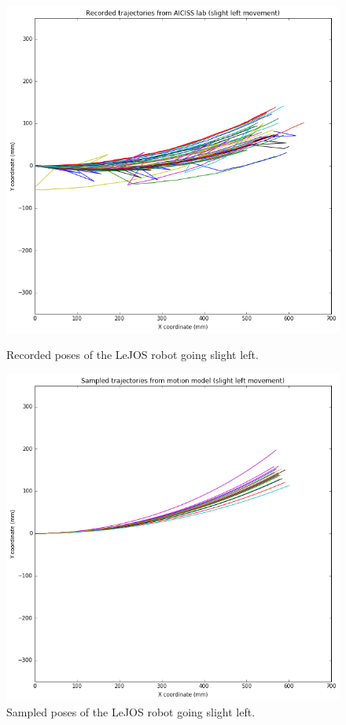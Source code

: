 \documentclass[paper=a4, fontsize=11pt]{scrartcl} %
\begin{document}
	\begin{figure}[h!]
		\centering
		\begin{minipage}{0.45\textwidth}
			\centering
			\includegraphics[width=1\textwidth]{images/recorded_poses_slight_left.png} %
			\caption{Recorded poses of the LeJOS robot going slight left.}
		\end{minipage}\hfill
		\begin{minipage}{0.45\textwidth}
			\centering
			\includegraphics[width=1\textwidth]{images/sampled_poses_slightLeft.png} %
			\caption{Sampled poses of the LeJOS robot going slight left.}
		\end{minipage}
	\end{figure}
    
\end{document}
